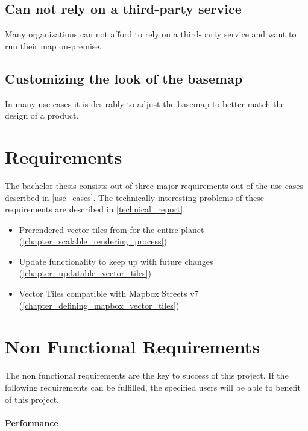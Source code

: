 \subsection{Can not rely on a third-party service}

Many organizations can not afford to rely on a third-party service and want to run their map on-premise.

\subsection{Customizing the look of the basemap}

In many use cases it is desirably to adjust the basemap to better match the design of a product.

\section{Requirements}\label{requirements}

The bachelor thesis consists out of three major requirements out of the use cases described in \autoref{use_cases}. The technically interesting problems of these requirements are described in \autoref{technical_report}.

\begin{itemize}
    \item Prerendered vector tiles from \osm{} for the entire planet (\autoref{chapter_scalable_rendering_process})
    \item Update functionality to keep up with future \osm{} changes (\autoref{chapter_updatable_vector_tiles})
    \item Vector Tiles compatible with Mapbox Streets v7 (\autoref{chapter_defining_mapbox_vector_tiles})
\end{itemize}


\section{Non Functional Requirements}\label{non_functional_requirements}

The non functional requirements are the key to success of this project. If the following requirements can be fulfilled, the specified users will be able to benefit of this project.

\paragraph{Performance}

